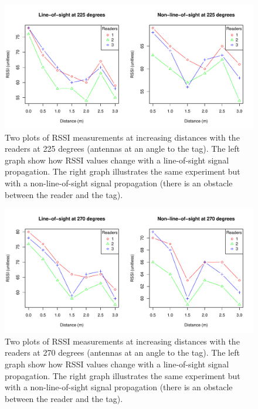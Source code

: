 \begin{figure}[H]
	\begin{center}
		\includegraphics[width=1\textwidth]{figures/rssi_distance_3m_225deg}
		\caption{Two plots of RSSI measurements at increasing distances with the readers at 225 degrees (antennas at an angle to the tag). The left graph show how RSSI values change with a line-of-sight signal propagation. The right graph illustrates the same experiment but with a non-line-of-sight signal propagation (there is an obstacle between the reader and the tag).}
	\end{center}
\end{figure}

\begin{figure}[H]
	\begin{center}
		\includegraphics[width=1\textwidth]{figures/rssi_distance_3m_270deg}
		\caption{Two plots of RSSI measurements at increasing distances with the readers at 270 degrees (antennas at an angle to the tag). The left graph show how RSSI values change with a line-of-sight signal propagation. The right graph illustrates the same experiment but with a non-line-of-sight signal propagation (there is an obstacle between the reader and the tag).}
	\end{center}
\end{figure}

